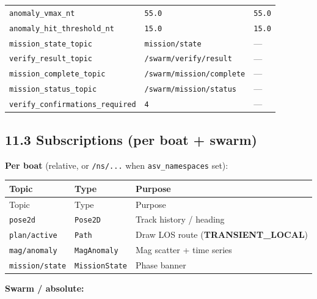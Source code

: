 \begin{center}
\begin{longtable}{@{}llp{7.2cm}@{}}
\texttt{anomaly\_vmax\_nt} & \texttt{55.0} & \texttt{55.0} \\
\texttt{anomaly\_hit\_threshold\_nt} & \texttt{15.0} & \texttt{15.0} \\
\texttt{mission\_state\_topic} & \texttt{mission/state} & --- \\
\texttt{verify\_result\_topic} & \texttt{/swarm/verify/result} & --- \\
\texttt{mission\_complete\_topic} & \texttt{/swarm/mission/complete} & --- \\
\texttt{mission\_status\_topic} & \texttt{/swarm/mission/status} & --- \\
\texttt{verify\_confirmations\_required} & \texttt{4} & --- \\
\bottomrule
\end{longtable}
\end{center}


\subsection{11.3 Subscriptions (per boat + swarm)}


\textbf{Per boat} (relative, or \texttt{/ns/...} when \texttt{asv\_namespaces} set):


\begin{center}
\small
\begin{longtable}{@{}llp{7.2cm}@{}}
\toprule
Topic & Type & Purpose \\
\midrule
\endfirsthead
\toprule
Topic & Type & Purpose \\
\midrule
\endhead
\texttt{pose2d} & \texttt{Pose2D} & Track history / heading \\
\texttt{plan/active} & \texttt{Path} & Draw LOS route (\textbf{TRANSIENT\_LOCAL}) \\
\texttt{mag/anomaly} & \texttt{MagAnomaly} & Mag scatter + time series \\
\texttt{mission/state} & \texttt{MissionState} & Phase banner \\
\bottomrule
\end{longtable}
\end{center}


\textbf{Swarm / absolute:}


